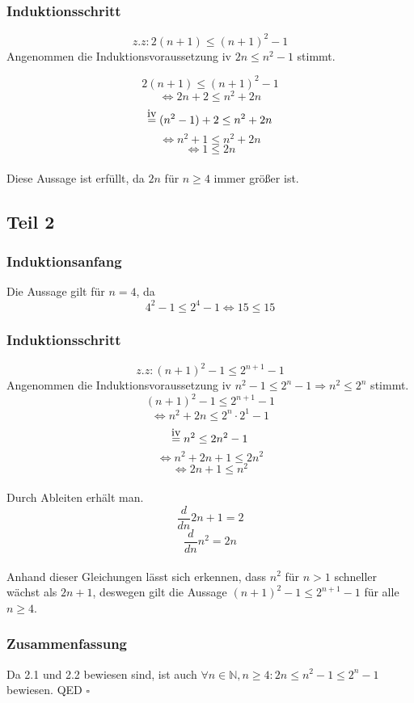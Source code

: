 \documentclass[a4paper]{article}
\newcommand\IVeq{\stackrel{\mathclap{\normalfont\mbox{iv}}}{=}}
\newcommand*{\QED}{\null\nobreak\hfill\ensuremath{\square}}%
\begin{document}
\subsubsection{Induktionsschritt }

\[ z.z:  2(n+1) \leq (n+1)^2 - 1 \]
\newline 
Angenommen die Induktionsvoraussetzung iv $ 2n \leq n^2 - 1 $ stimmt.

\[ 2(n+1) \leq (n+1)^2 - 1\]
\[ \Longleftrightarrow 2n+2 \leq n^2 + 2n\]
\[ \IVeq (n^2-1)+2 \leq n^2 + 2n\]
\[ \Longleftrightarrow n^2+1 \leq n^2 + 2n\]
\[ \Longleftrightarrow 1 \leq 2n\]
\\
Diese Aussage ist erfüllt, da $2n$ für $n \geq 4$ immer größer ist.


\subsection{Teil 2}

\subsubsection{Induktionsanfang}
Die Aussage gilt für $n=4$, da
\[ 4^2 - 1 \leq 2^4 -1 \Longleftrightarrow 15 \leq 15\]

\subsubsection{Induktionsschritt }

\[ z.z: (n+1)^2 - 1 \leq 2^{n+1} - 1 \]
\newline 
Angenommen die Induktionsvoraussetzung iv $ n^2 - 1 \leq 2^n -1 \Longrightarrow n^2 \leq 2^n$ stimmt.
\[ (n+1)^2 - 1 \leq 2^{n+1} - 1 \]
\[ \Longleftrightarrow n^2+2n \leq 2^n \cdot 2^1 - 1 \]
\[ \IVeq n^2 \leq 2n^2 - 1 \]
\[ \Longleftrightarrow n^2 + 2n + 1 \leq 2n^2\]
\[ \Longleftrightarrow 2n + 1 \leq n^2\]\\
Durch Ableiten erhält man.
\[ \frac{d}{dn} 2n + 1 = 2 \]
\[ \frac{d}{dn} n^2 = 2n \]
\\
Anhand dieser Gleichungen lässt sich erkennen, dass $n^2$ für $n>1$ schneller wächst als $2n + 1$, deswegen gilt die Aussage  $(n+1)^2 - 1 \leq 2^{n+1} - 1$ für alle $n \geq 4$.

\subsubsection{Zusammenfassung}
Da 2.1 und 2.2 bewiesen sind, ist auch $\forall n \in \mathbb{N},n \geq 4 :  2n \leq n^2 - 1 \leq 2^n -1$ bewiesen. QED 
\QED
\end{document}

